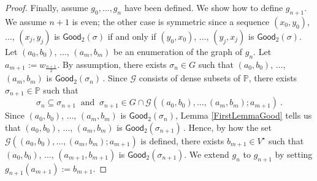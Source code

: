 \documentclass[10pt,a4paper, openany,  oldfontcommands]{memoir}
\newtheorem{open problem} [theorem] {Open Problem}
\begin{document}
\begin{proof}
Finally,  assume  $  g_0,  \ldots ,  g_n  $  have been defined. 
We  show how to  define   $ g_{ n+1}  $. 
We assume  $ n  +1  $  is even; the other case is symmetric
since a sequence   $ (x_0,  y_0)  $,  $  \ldots  $,  $(x_j , y_j )  $  is   $  \mathsf{Good}_2  \left(  \sigma \right)  $  
if and only if     $ (y_0,  x_0)  $,  $  \ldots  $,  $(y_j , x_j )  $  is   $  \mathsf{Good}_2  \left(  \sigma \right)  $.
Let  $  (a_0,  b_0 ) $,  $  \ldots  $,   $  (a_{ m} ,  b_{ m }  )  $ be an enumeration of the graph of  $  g_n  $. 
Let  $  a_{ m+1}  :=     w_{  \frac{n+1}{2} }   $. 
By assumption,  there exists  $  \sigma_n  \in  G  $  such that    $  (a_0,  b_0 ) $,  $  \ldots  $,   $  (a_{ m} ,  b_{ m}  )  $ is 
 $  \mathsf{Good}_2  \left(  \sigma_n \right)    \,    $.  
Since   $  \mathcal{G} $  consists of dense subsets of   $  \mathbb{P} $,   there exists  $  \sigma_{ n+1}  \in  \mathbb{P} $  such that  
\[
\sigma_n   \subseteq   \sigma_{ n+1}  
\      \mbox{  and   }   \   
\sigma_{ n+1}   \in G  \cap  \mathcal{G}   \left(  (a_0, b_0) ,  \ldots  ,( a_m, b_m )   ;   a_{ m+1}  \right) 
\          .
\]
Since  
 $  (a_0,  b_0 ) $,  $  \ldots  $,   $  (a_{ m} ,  b_{ m}  )  $ is  $  \mathsf{Good}_2  \left(  \sigma_{ n}  \right)      $, 
Lemma \ref{FirstLemmaGood} tells us that  
     $  (a_0,  b_0 ) $,  $  \ldots  $,   $  (a_{ m} ,  b_{ m}  )  $ is   $  \mathsf{Good}_2  \left(  \sigma_{ n+1}  \right)      \,    $. 
 Hence, by how  the set  $  \mathcal{G}   \left(  (a_0, b_0) ,  \ldots  ,( a_m, b_m )   ;   a_{ m+1}  \right)   $  is defined, 
 there exists  $  b_{ m+1}  \in  V^{  \star  }  $  such that  
  $  (a_0,  b_0 ) $,  $  \ldots  $,   $  (a_{ m+1} ,  b_{ m+1}  )  $ is   $  \mathsf{Good}_2  \left(  \sigma_{ n+1}  \right)  $. 
 We extend  $  g_n $  to  $  g_{ n+1}  $  by setting  $  g_{ n+1}  \left(    a_{ m+1}   \right)  :=  b_{ m+1}   $. 
\end{proof}
\end{document}
